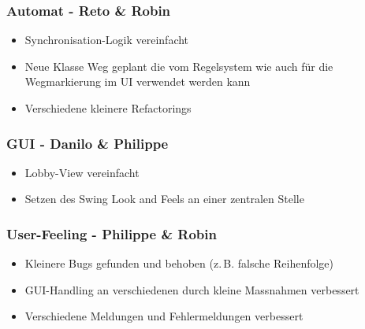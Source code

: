 \documentclass[12pt,halfparskip]{scrartcl}
\begin{document}

\subsubsection{Automat - Reto \& Robin}
\label{ssub:automat_reto_amp_robin}

\begin{itemize}
	\item Synchronisation-Logik vereinfacht
	\item Neue Klasse Weg geplant die vom Regelsystem wie auch für die Wegmarkierung im UI verwendet werden kann
	\item Verschiedene kleinere Refactorings
\end{itemize}


\subsubsection{GUI - Danilo \& Philippe}
\label{ssub:gui_danilo_amp_philippe}

\begin{itemize}
	\item Lobby-View vereinfacht
	\item Setzen des Swing Look and Feels an einer zentralen Stelle
\end{itemize}


\subsubsection{User-Feeling - Philippe \& Robin}
\label{ssub:user_feeling_philippe_amp_robin}

\begin{itemize}
	\item Kleinere Bugs gefunden und behoben (z.\,B. falsche Reihenfolge)
	\item GUI-Handling an verschiedenen durch kleine Massnahmen verbessert
	\item Verschiedene Meldungen und Fehlermeldungen verbessert
\end{itemize}
\end{document}
